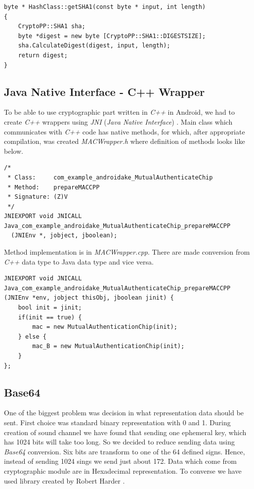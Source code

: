 \documentclass[11pt,titlepage]{article}
\theoremstyle{plain}
\begin{document}
\begin{lstlisting}
byte * HashClass::getSHA1(const byte * input, int length)
{
	CryptoPP::SHA1 sha;
	byte *digest = new byte [CryptoPP::SHA1::DIGESTSIZE];
	sha.CalculateDigest(digest, input, length);
	return digest;
}
\end{lstlisting}

\subsection{Java Native Interface - C++ Wrapper}

To be able to use cryptographic part written in \textit{C++} in Android, we had to create \textit{C++} wrappers using \textit{JNI} (\textit{Java Native Interface}) \cite{JNI}. Main class which communicates with \textit{C++} code has native methods, for which, after appropriate compilation, was created \textit{MACWrapper.h} where definition of methods looks like below.

\begin{lstlisting}
/*
 * Class:     com_example_androidake_MutualAuthenticateChip
 * Method:    prepareMACCPP
 * Signature: (Z)V
 */
JNIEXPORT void JNICALL Java_com_example_androidake_MutualAuthenticateChip_prepareMACCPP
  (JNIEnv *, jobject, jboolean);
\end{lstlisting}

Method implementation is in \textit{MACWrapper.cpp}. There are made conversion from \textit{C++} data type to Java data type and vice versa.

\begin{lstlisting}
JNIEXPORT void JNICALL Java_com_example_androidake_MutualAuthenticateChip_prepareMACCPP
(JNIEnv *env, jobject thisObj, jboolean jinit) {
	bool init = jinit;
	if(init == true) {
		mac = new MutualAuthenticationChip(init);
	} else {
		mac_B = new MutualAuthenticationChip(init);
	}
};
\end{lstlisting}

\subsection{Base64}

One of the biggest problem was decision in what representation data should be sent. First choice was standard binary representation with 0 and 1. During creation of sound channel we have found that sending one ephemeral key, which has 1024 bits will take too long. So we decided to reduce sending data using \textit{Base64} conversion. Six bits are transform to one of the 64 defined signs. Hence, instead of sending 1024 sings we send just about 172. Data which come from cryptographic module are in Hexadecimal representation. To converse we have used library created by Robert Harder \cite{base_64}. 
\end{document}
